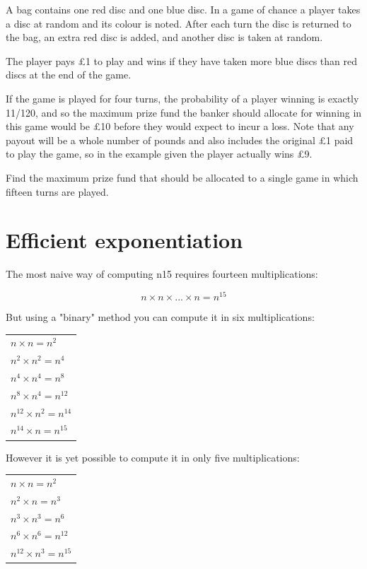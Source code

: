A bag contains one red disc and one blue disc. In a game of chance a player takes a disc at random and its colour is noted. After each turn the disc is returned to the bag, an extra red disc is added, and another disc is taken at random.

The player pays £1 to play and wins if they have taken more blue discs than red discs at the end of the game.

If the game is played for four turns, the probability of a player winning is exactly 11/120, and so the maximum prize fund the banker should allocate for winning in this game would be £10 before they would expect to incur a loss. Note that any payout will be a whole number of pounds and also includes the original £1 paid to play the game, so in the example given the player actually wins £9.
\medskip

Find the maximum prize fund that should be allocated to a single game in which fifteen turns are played.


\section{Efficient exponentiation} \label{pb.0122}

The most naive way of computing n15 requires fourteen multiplications:

$$n \times n \times ... \times n = n^{15}$$

But using a "binary" method you can compute it in six multiplications:

\begin{center}
    \begin{tabular}{l}
        $n \times n = n^2$\\
        $n^2 \times n^2 = n^4$\\
        $n^4 \times n^4 = n^8$\\
        $n^8 \times n^4 = n^{12}$\\
        $n^{12} \times n^2 = n^{14}$\\
        $n^{14} \times n = n^{15}$\\
    \end{tabular}
\end{center}


However it is yet possible to compute it in only five multiplications:

\begin{center}
    \begin{tabular}{l}
        $n \times n = n^2$\\
        $n^2 \times n = n^3$\\
        $n^3 \times n^3 = n^6$\\
        $n^6 \times n^6 = n^{12}$\\
        $n^{12} \times n^3 = n^{15}$\\
    \end{tabular}
\end{center}


